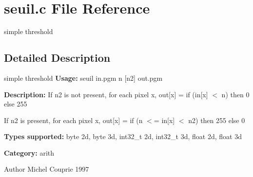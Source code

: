 \section{seuil.c File Reference}
\label{seuil_8c}


simple threshold  




\subsection{Detailed Description}
simple threshold {\bfseries Usage:} seuil in.pgm n [n2] out.pgm

{\bfseries Description:} If n2 is not present, for each pixel x, out[x] = if (in[x] $<$ n) then 0 else 255

If n2 is present, for each pixel x, out[x] = if (n $<$= in[x] $<$ n2) then 255 else 0

{\bfseries Types supported:} byte 2d, byte 3d, int32\_\-t 2d, int32\_\-t 3d, float 2d, float 3d

{\bfseries Category:} arith

\begin{DoxyAuthor}{Author}
Michel Couprie 1997 
\end{DoxyAuthor}
